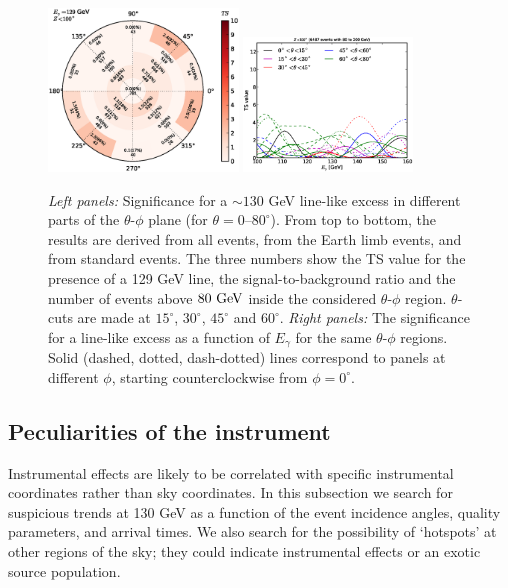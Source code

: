 \documentclass[aps,twocolumn,prd,superscriptaddress,showpacs,nofootinbib,fixfloat]{revtex4}
\newcommand{\GeV}{{\rm ~GeV}}
\begin{document}
\begin{figure}
  \includegraphics[width=0.45\textwidth]{plots/polar_z.LE.100.eps}
  \includegraphics[width=0.40\textwidth]{plots/scan_z.LE.100.eps}
  \caption{\emph{Left panels:} Significance for a $\sim130$ GeV
  line-like excess in different parts of the $\theta$-$\phi$
  plane (for $\theta=0$--$80^\circ$). From top to bottom,
  the results are derived from all events, from the Earth
  limb events, and from standard events. The three numbers
  show the TS value for the presence of a 129 GeV line, the
  signal-to-background ratio and the number of events above
  $80\GeV$ inside the considered $\theta$-$\phi$ region.
  $\theta$-cuts are made at $15^\circ$, $30^\circ$, $45^\circ$ and $60^\circ$.
  \emph{Right panels:} The significance for a
  line-like excess as a function of $E_\gamma$ for the same $\theta$-$\phi$ regions.
  Solid (dashed, dotted, dash-dotted) lines correspond to panels at different
  $\phi$, starting counterclockwise from $\phi=0^\circ$.
  }
  \label{fig:polarPlotsAll}
\end{figure}


\subsection{Peculiarities of the instrument}
Instrumental effects are likely to be correlated with specific instrumental
coordinates rather than sky coordinates. In this subsection we search for
suspicious trends at 130 GeV as a function of the event incidence angles,
quality parameters, and arrival times.  We also search for the possibility of
`hotspots' at other regions of the sky; they could indicate instrumental
effects or an exotic source population.
\medskip
\end{document}
